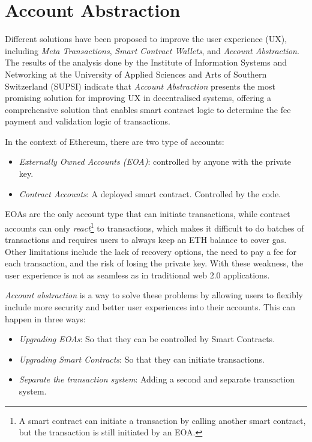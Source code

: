 \section{Account Abstraction}
\label{sec:account_abstraction}


Different solutions have been proposed to improve the user experience (UX), including \textit{Meta Transactions}, \textit{Smart Contract Wallets}, and \textit{Account Abstraction}. The results of the analysis done by the Institute of Information Systems and Networking at the University of Applied Sciences and Arts of Southern Switzerland (SUPSI) indicate that \textit{Account Abstraction} presents the most promising solution for improving UX in decentralised systems, offering a comprehensive solution that enables smart contract logic to determine the fee payment and validation logic of transactions. \cite{isin-aa-user-experience}


In the context of Ethereum, there are two type of accounts: \cite{ethereum-accounts}

\begin{itemize}
    \item \textit{Externally Owned Accounts (EOA)}: controlled by anyone with the private key.
    \item \textit{Contract Accounts}: A deployed smart contract. Controlled by the code.
\end{itemize}


EOAs are the only account type that can initiate transactions, while contract accounts can only \textit{react}\footnote{A smart contract can initiate a transaction by calling another smart contract, but the transaction is still initiated by an EOA.} to transactions, which makes it difficult to do batches of transactions and requires users to always keep an ETH balance to cover gas. Other limitations include the lack of recovery options, the need to pay a fee for each transaction, and the risk of losing the private key. With these weakness, the user experience is not as seamless as in traditional web 2.0 applications. \cite{ethereum-account-abstraction}



\textit{Account abstraction} is a way to solve these problems by allowing users to flexibly include more security and better user experiences into their accounts. This can happen in three ways: \cite{ethereum-account-abstraction}
\begin{itemize}
    \item \textit{Upgrading EOAs}: So that they can be controlled by Smart Contracts.
    \item \textit{Upgrading Smart Contracts}: So that they can initiate transactions. 
    \item \textit{Separate the transaction system}: Adding a second and separate transaction system.
\end{itemize}

